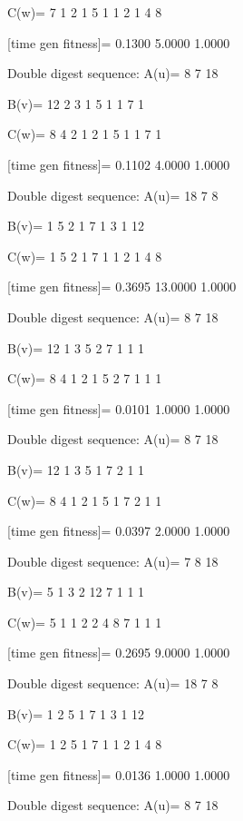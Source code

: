 C(w)=
     7     1     2     1     5     1     1     2     1     4     8

[time gen fitness]=
    0.1300    5.0000    1.0000

Double digest sequence:
A(u)=
     8     7    18

B(v)=
    12     2     3     1     5     1     1     7     1

C(w)=
     8     4     2     1     2     1     5     1     1     7     1

[time gen fitness]=
    0.1102    4.0000    1.0000

Double digest sequence:
A(u)=
    18     7     8

B(v)=
     1     5     2     1     7     1     3     1    12

C(w)=
     1     5     2     1     7     1     1     2     1     4     8

[time gen fitness]=
    0.3695   13.0000    1.0000

Double digest sequence:
A(u)=
     8     7    18

B(v)=
    12     1     3     5     2     7     1     1     1

C(w)=
     8     4     1     2     1     5     2     7     1     1     1

[time gen fitness]=
    0.0101    1.0000    1.0000

Double digest sequence:
A(u)=
     8     7    18

B(v)=
    12     1     3     5     1     7     2     1     1

C(w)=
     8     4     1     2     1     5     1     7     2     1     1

[time gen fitness]=
    0.0397    2.0000    1.0000

Double digest sequence:
A(u)=
     7     8    18

B(v)=
     5     1     3     2    12     7     1     1     1

C(w)=
     5     1     1     2     2     4     8     7     1     1     1

[time gen fitness]=
    0.2695    9.0000    1.0000

Double digest sequence:
A(u)=
    18     7     8

B(v)=
     1     2     5     1     7     1     3     1    12

C(w)=
     1     2     5     1     7     1     1     2     1     4     8

[time gen fitness]=
    0.0136    1.0000    1.0000

Double digest sequence:
A(u)=
     8     7    18

